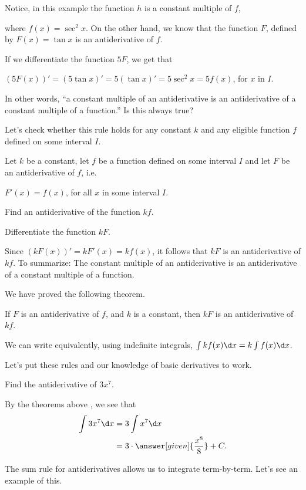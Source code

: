 \documentclass{ximera}
\begin{document}
Notice, in this example the function $h$ is a constant multiple of $f$, 

where $f(x)=\sec^{2}{x}$. On the other hand, we know that the function $F$, defined by 
$F(x)=\tan{x}$ is an antiderivative of $f$.

If we  differentiate the function $5F$, we get that

  $\left(5F(x)\right)'=\left(5\tan{x}\right)'=5\left(\tan{x}\right)'=5\sec^{2}{x}=5f(x)$, for $x$ in $I$.
  
  In other words, ``a constant multiple of an antiderivative is an antiderivative of a constant multiple of a function.''
Is this always true?

Let's check whether this rule holds for  any constant $k$ and any eligible  function $f$ defined on some interval $I$.
 \begin{question}
Let $k$ be a constant, let $f$ be a function defined on some interval $I$ and let $F$ be an antiderivative of $f$, i.e.

$F'(x)=f(x)$, for all  $x$ in some interval $I$.

  Find an antiderivative of the function $k f$.
    \begin{hint}
    Differentiate the function $kF$.
     \end{hint}
     Since $\left(kF(x)\right)'=kF'(x)=kf(x)$, it follows that $kF$ is
     an antiderivative of $kf$.
 To summarize: The constant multiple of an antiderivative is an antiderivative of a constant multiple of a function. 
\end{question}
We have proved the following theorem.
\begin{theorem}\label{theorem:CMRA}
If $F$ is an antiderivative of $f$, and $k$ is a constant, then $kF$
is an antiderivative of $kf$.

We can write equivalently, using indefinite integrals, 
$\int kf(x) \d x= k\int f(x)\d x$.
\end{theorem}
Let's put these rules and our knowledge of basic derivatives to work.
\begin{example}
Find the antiderivative of $3 x^7$.
\begin{explanation}
By the theorems above , we see that
\begin{align*}
\int 3 x^7 \d x &= 3 \int x^7 \d x\\
&= 3 \cdot \answer[given]{\frac{x^8}{8}}+C.
\end{align*}
\end{explanation}
\end{example}
The sum rule for antiderivatives allows us to integrate
term-by-term. Let's see an example of this.
\end{document}
